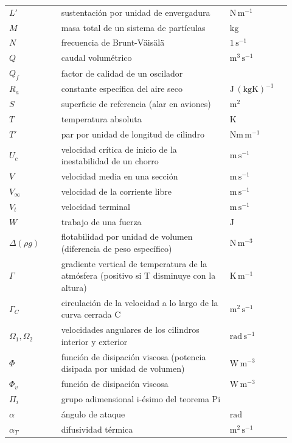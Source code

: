 \documentclass[10pt,openany]{book}
\begin{document}
\begin{longtable}{@{}>{\centering\arraybackslash}p{0.17\linewidth}>{\raggedright\arraybackslash}p{0.55\linewidth}>{\raggedright\arraybackslash}p{0.2\linewidth}@{}}
$L'$ & sustentación por unidad de envergadura & $\mathrm{N\,m^{-1}}$ \\
$M$ & masa total de un sistema de partículas & $\mathrm{kg}$ \\
$N$ & frecuencia de Brunt-Väisälä & $\mathrm{1\,s^{-1}}$ \\
$Q$ & caudal volumétrico & $\mathrm{m^{3}\,s^{-1}}$ \\
$Q_{f}$ & factor de calidad de un oscilador &  \\
$R_{a}$ & constante específica del aire seco & $\mathrm{J\,(kg K)^{-1}}$ \\
$S$ & superficie de referencia (alar en aviones) & $\mathrm{m^{2}}$ \\
$T$ & temperatura absoluta & $\mathrm{K}$ \\
$T'$ & par por unidad de longitud de cilindro & $\mathrm{N m\,m^{-1}}$ \\
$U_{c}$ & velocidad crítica de inicio de la inestabilidad de un chorro & $\mathrm{m\,s^{-1}}$ \\
$V$ & velocidad media en una sección & $\mathrm{m\,s^{-1}}$ \\
$V_\infty$ & velocidad de la corriente libre & $\mathrm{m\,s^{-1}}$ \\
$V_{t}$ & velocidad terminal & $\mathrm{m\,s^{-1}}$ \\
$W$ & trabajo de una fuerza & $\mathrm{J}$ \\
$\Delta(\rho g)$ & flotabilidad por unidad de volumen (diferencia de peso específico) & $\mathrm{N\,m^{-3}}$ \\
$\Gamma$ & gradiente vertical de temperatura de la atmósfera (positivo si T disminuye con la altura) & $\mathrm{K\,m^{-1}}$ \\
$\Gamma_C$ & circulación de la velocidad a lo largo de la curva cerrada C & $\mathrm{m^{2}\,s^{-1}}$ \\
$\Omega_1, \Omega_2$ & velocidades angulares de los cilindros interior y exterior & $\mathrm{rad\,s^{-1}}$ \\
$\Phi$ & función de disipación viscosa (potencia disipada por unidad de volumen) & $\mathrm{W\,m^{-3}}$ \\
$\Phi_v$ & función de disipación viscosa & $\mathrm{W\,m^{-3}}$ \\
$\Pi_i$ & grupo adimensional i-ésimo del teorema Pi &  \\
$\alpha$ & ángulo de ataque & $\mathrm{rad}$ \\
$\alpha_T$ & difusividad térmica & $\mathrm{m^{2}\,s^{-1}}$ \\

\end{longtable}
\end{document}
